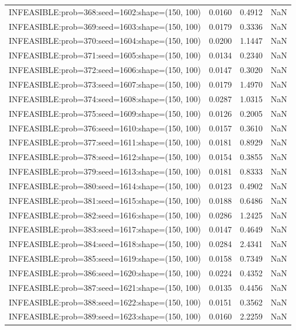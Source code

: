 \begin{longtable}{lccc}
INFEASIBLE:prob=368:seed=1602:shape=(150, 100) &   0.0160 &  0.4912 &    NaN \\
INFEASIBLE:prob=369:seed=1603:shape=(150, 100) &   0.0179 &  0.3336 &    NaN \\
INFEASIBLE:prob=370:seed=1604:shape=(150, 100) &   0.0200 &  1.1447 &    NaN \\
INFEASIBLE:prob=371:seed=1605:shape=(150, 100) &   0.0134 &  0.2340 &    NaN \\
INFEASIBLE:prob=372:seed=1606:shape=(150, 100) &   0.0147 &  0.3020 &    NaN \\
INFEASIBLE:prob=373:seed=1607:shape=(150, 100) &   0.0179 &  1.4970 &    NaN \\
INFEASIBLE:prob=374:seed=1608:shape=(150, 100) &   0.0287 &  1.0315 &    NaN \\
INFEASIBLE:prob=375:seed=1609:shape=(150, 100) &   0.0126 &  0.2005 &    NaN \\
INFEASIBLE:prob=376:seed=1610:shape=(150, 100) &   0.0157 &  0.3610 &    NaN \\
INFEASIBLE:prob=377:seed=1611:shape=(150, 100) &   0.0181 &  0.8929 &    NaN \\
INFEASIBLE:prob=378:seed=1612:shape=(150, 100) &   0.0154 &  0.3855 &    NaN \\
INFEASIBLE:prob=379:seed=1613:shape=(150, 100) &   0.0181 &  0.8333 &    NaN \\
INFEASIBLE:prob=380:seed=1614:shape=(150, 100) &   0.0123 &  0.4902 &    NaN \\
INFEASIBLE:prob=381:seed=1615:shape=(150, 100) &   0.0188 &  0.6486 &    NaN \\
INFEASIBLE:prob=382:seed=1616:shape=(150, 100) &   0.0286 &  1.2425 &    NaN \\
INFEASIBLE:prob=383:seed=1617:shape=(150, 100) &   0.0147 &  0.4649 &    NaN \\
INFEASIBLE:prob=384:seed=1618:shape=(150, 100) &   0.0284 &  2.4341 &    NaN \\
INFEASIBLE:prob=385:seed=1619:shape=(150, 100) &   0.0158 &  0.7349 &    NaN \\
INFEASIBLE:prob=386:seed=1620:shape=(150, 100) &   0.0224 &  0.4352 &    NaN \\
INFEASIBLE:prob=387:seed=1621:shape=(150, 100) &   0.0135 &  0.4456 &    NaN \\
INFEASIBLE:prob=388:seed=1622:shape=(150, 100) &   0.0151 &  0.3562 &    NaN \\
INFEASIBLE:prob=389:seed=1623:shape=(150, 100) &   0.0160 &  2.2259 &    NaN \\

\end{longtable}

